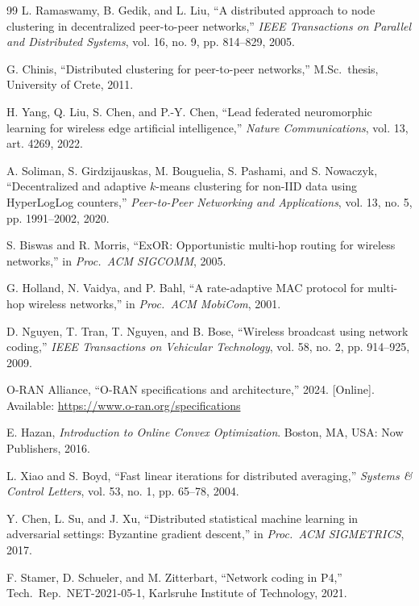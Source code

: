 \documentclass[journal]{IEEEtran}
\begin{document}
\begin{thebibliography}{99}
 L. Ramaswamy, B. Gedik, and L. Liu, ``A distributed approach to node clustering in decentralized peer-to-peer networks,'' \textit{IEEE Transactions on Parallel and Distributed Systems}, vol. 16, no. 9, pp. 814--829, 2005.

 G. Chinis, ``Distributed clustering for peer-to-peer networks,'' M.Sc.\ thesis, University of Crete, 2011.

 H. Yang, Q. Liu, S. Chen, and P.-Y. Chen, ``Lead federated neuromorphic learning for wireless edge artificial intelligence,'' \textit{Nature Communications}, vol. 13, art. 4269, 2022.

 A. Soliman, S. Girdzijauskas, M. Bouguelia, S. Pashami, and S. Nowaczyk, ``Decentralized and adaptive $k$-means clustering for non-IID data using HyperLogLog counters,'' \textit{Peer-to-Peer Networking and Applications}, vol. 13, no. 5, pp. 1991--2002, 2020.

 S. Biswas and R. Morris, ``ExOR: Opportunistic multi-hop routing for wireless networks,'' in \textit{Proc.\ ACM SIGCOMM}, 2005.

 G. Holland, N. Vaidya, and P. Bahl, ``A rate-adaptive MAC protocol for multi-hop wireless networks,'' in \textit{Proc.\ ACM MobiCom}, 2001.

 D. Nguyen, T. Tran, T. Nguyen, and B. Bose, ``Wireless broadcast using network coding,'' \textit{IEEE Transactions on Vehicular Technology}, vol. 58, no. 2, pp. 914--925, 2009.

 O-RAN Alliance, ``O-RAN specifications and architecture,'' 2024. [Online]. Available: \url{https://www.o-ran.org/specifications}

 E. Hazan, \textit{Introduction to Online Convex Optimization}. Boston, MA, USA: Now Publishers, 2016.

 L. Xiao and S. Boyd, ``Fast linear iterations for distributed averaging,'' \textit{Systems \& Control Letters}, vol. 53, no. 1, pp. 65--78, 2004.

 Y. Chen, L. Su, and J. Xu, ``Distributed statistical machine learning in adversarial settings: Byzantine gradient descent,'' in \textit{Proc.\ ACM SIGMETRICS}, 2017.

 F. Stamer, D. Schueler, and M. Zitterbart, ``Network coding in P4,'' Tech.\ Rep.\ NET-2021-05-1, Karlsruhe Institute of Technology, 2021.


\end{thebibliography}
\end{document}
